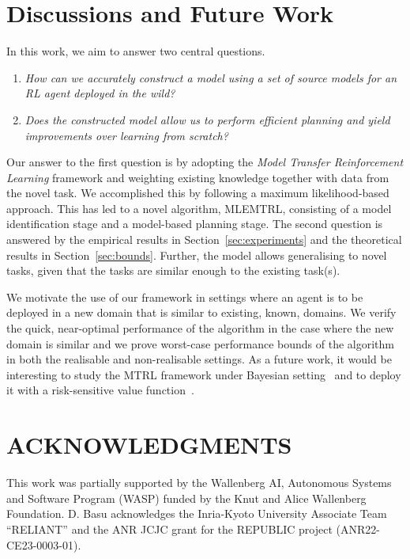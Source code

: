 \section{Discussions and Future Work}\label{sec:discussion}
In this work, we aim to answer two central questions.
\begin{enumerate}
   \item \emph{How can we accurately construct a model using a set of source models for an RL agent deployed in the wild?}
   \item \emph{Does the constructed model allow us to perform efficient planning and yield improvements over learning from scratch?}
\end{enumerate}

Our answer to the first question is by adopting the \emph{Model Transfer Reinforcement Learning} framework and weighting existing knowledge together with data from the novel task. We accomplished this by following a maximum likelihood-based approach. This has led to a novel algorithm, MLEMTRL, consisting of a model identification stage and a model-based planning stage. 
The second question is answered by the empirical results in Section~\ref{sec:experiments} and the theoretical results in Section~\ref{sec:bounds}. Further, the model allows generalising to novel tasks, given that the tasks are similar enough to the existing task(s). 

We motivate the use of our framework in settings where an agent is to be deployed in a new domain that is similar to existing, known, domains. We verify the quick, near-optimal performance of the algorithm in the case where the new domain is similar and we prove worst-case performance bounds of the algorithm in both the realisable and non-realisable settings.
As a future work, it would be interesting to study the MTRL framework under Bayesian setting~\citep{tamar2022regularization} and to deploy it with a risk-sensitive value function~\citep{eriksson2022sentinel,saac}.

\section*{ACKNOWLEDGMENTS}
This work was partially supported by the Wallenberg AI, Autonomous Systems and Software Program (WASP) funded by the Knut and Alice Wallenberg Foundation. D. Basu acknowledges the Inria-Kyoto University Associate Team “RELIANT” and the ANR JCJC grant for the REPUBLIC project (ANR22-CE23-0003-01).


